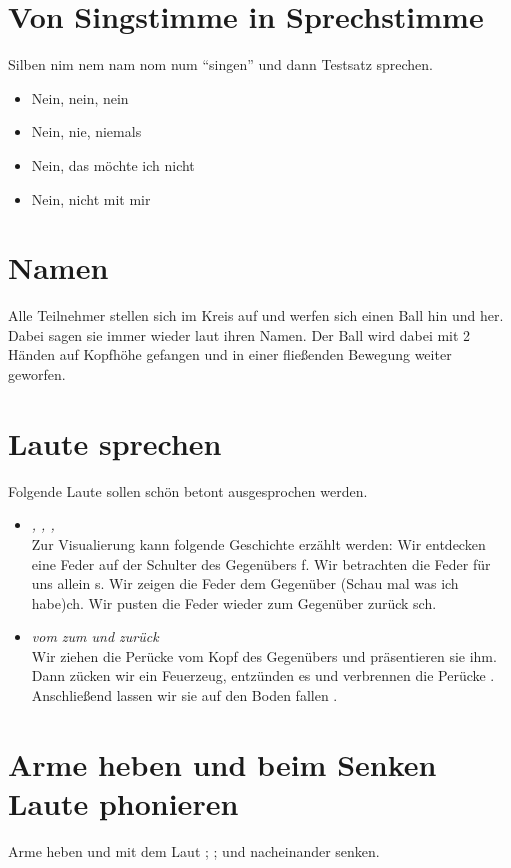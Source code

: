 \documentclass[ngerman, a4paper, twoside]{scrbook}%
\begin{document}
	\section{Von Singstimme in Sprechstimme}
	Silben nim nem nam nom num "`singen"' und dann Testsatz sprechen.
	\begin{itemize}
		\item Nein, nein, nein
		\item Nein, nie, niemals
		\item Nein, das möchte ich nicht
		\item Nein, nicht mit mir
	\end{itemize}

	\section{Namen}
	 Alle Teilnehmer stellen sich im Kreis auf und werfen sich einen Ball hin und her. Dabei sagen sie immer wieder laut ihren Namen. Der Ball wird dabei mit 2 Händen auf Kopfhöhe gefangen und in einer fließenden Bewegung weiter geworfen.

	 \section{Laute sprechen}
	 Folgende Laute sollen schön betont ausgesprochen werden.
	  \begin{itemize}
	  	\item \emph{\textipa{[f]}, \textipa{[s]}, \textipa{[\c{c}]}, \textipa{[\textesh]}}\\
	  	Zur Visualierung kann folgende Geschichte erzählt werden: Wir entdecken eine Feder auf der Schulter des Gegenübers {f}. Wir betrachten die Feder für uns allein {s}. Wir zeigen die Feder dem Gegenüber (Schau mal was ich habe){ch}. Wir pusten die Feder wieder zum Gegenüber zurück {sch}.
	  	\item \emph{vom \textipa{[s]} zum \textipa{[\textesh]} und zurück}\\
	  	Wir ziehen die Perücke vom Kopf des Gegenübers \textipa{[\textesh]} und präsentieren sie ihm. Dann zücken wir ein Feuerzeug, entzünden es \textipa{[s]} und verbrennen die Perücke \textipa{[\textesh]}. Anschließend lassen wir sie auf den Boden fallen \textipa{[ft]}.
	  \end{itemize}
	  \section{Arme heben und beim Senken Laute phonieren}
	  Arme heben und mit dem Laut \textipa{[s]}; \textipa{[z]}; \textipa{[v]} und \textipa{[ft]} nacheinander senken.
\end{document}
